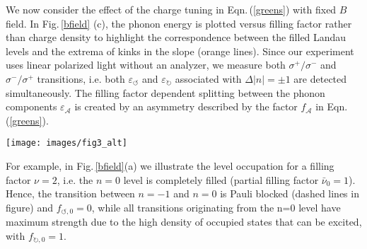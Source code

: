 \documentclass[prl,aps,superscriptaddress,showpacs,reprint]{revtex4-1}
\begin{document}
We now consider the effect of the charge tuning in Eqn.\,(\ref{greens}) with fixed $B$ field.  In Fig.\,\ref{bfield} (c), the phonon energy is plotted versus filling factor rather than charge density to highlight the correspondence between the filled Landau levels and the extrema of kinks in the slope (orange lines). Since our experiment uses linear polarized light without an analyzer, we measure both  $\sigma^+/\sigma^-$  and $\sigma^-/\sigma^+$ transitions, i.e. both $\varepsilon_{\circlearrowleft}$ and $\varepsilon_{\circlearrowright}$ associated with $\Delta |n|=\pm1$ are detected simultaneously. The filling factor dependent splitting between the phonon components $\varepsilon_{\mathcal{A}}$ is created by an asymmetry described by the factor $f_{\mathcal{A}}$ in Eqn.\,(\ref{greens}).
\begin{figure*}
\texttt{[image: images/fig3\_alt]}
\caption{\label{bfield} a)Schematic view of the Landau level spectrum at $B=12.6\: T$, filling factor $\nu=2$ and the lowest Landau level transitions participating in magneto-phonon coupling. Filled electronic states are highlighted using orange color. Red and blue arrows show transitions allowed by the selection rule $\Delta\left|n\right|= \pm 1$. Dashed arrows mark Pauli blocked transitions. Circular arrows represent the angular momentum involved in the transitions b) Relative strength and filling factor dependence of individual terms of the phonon self energy for $\circlearrowright$-transitions. Terms describing interband transitions are shaded red, intraband transitions are shaded green.  c) Phonon energy as a function of the filling factor at $B=12.6\: T$. Vertical orange lines mark specific filling factors at $\nu=-6,-2,0,2,6$ where the n=-1,0,1 levels are completely filled/depleted with charge carriers ($\nu=0$ - half filling of n=0 level). The calculated magneto-phonon energies according to Eqn.\,(\ref{greens}) are plotted as solid red($\Delta n = +1$) and solid blue($\Delta n = -1$) lines. Dashed lines: Numerical result for $\varepsilon_G$  including the effect of $\Delta n = 0$ transitions.}
\end{figure*}
For example, in Fig.\,\ref{bfield}(a) we illustrate the level occupation for a filling factor $\nu=2$, i.e. the $n=0$ level is completely filled (partial filling factor $\bar{\nu}_0=1$). Hence,  the transition between $n=-1$ and $ n=0$ is Pauli blocked (dashed lines in figure) and  $f_{\circlearrowleft,0}=0$, while all transitions originating from the n=0 level have maximum strength due to the high density of occupied states that can be excited, with $f_{\circlearrowright,0}=1$.
\end{document}
